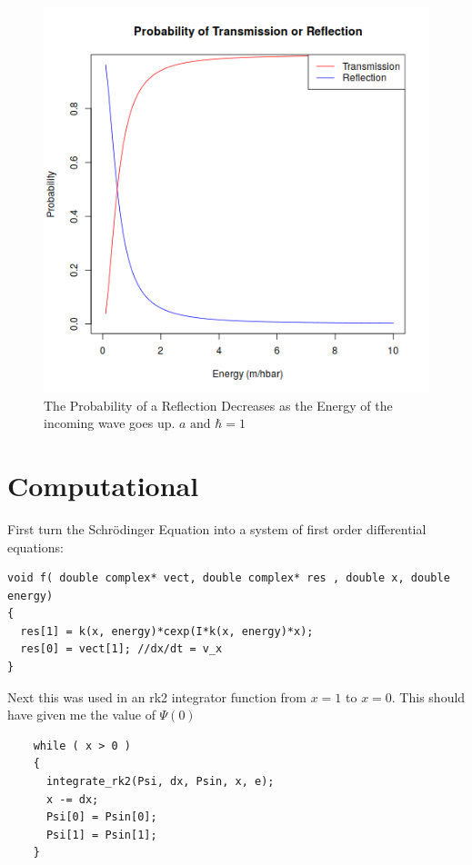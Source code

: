 \documentclass[12pt]{article}
\begin{document}
\begin{figure}
  \includegraphics{transorref.png}
  \caption{The Probability of a Reflection Decreases as the Energy of the incoming wave goes up. $a \mbox{ and } \hbar=1$}
\end{figure}



\pagebreak
\section{Computational}

First turn the Schr{\"o}dinger Equation into a system of first order differential equations:

\begin{verbatim}
void f( double complex* vect, double complex* res , double x, double energy)
{
  res[1] = k(x, energy)*cexp(I*k(x, energy)*x);
  res[0] = vect[1]; //dx/dt = v_x
}
\end{verbatim}

Next this was used in an rk2 integrator function from $x=1$ to $x=0$. This should have given me the value of $\Psi(0)$
\begin{verbatim}
    while ( x > 0 )
    {
      integrate_rk2(Psi, dx, Psin, x, e);
      x -= dx;
      Psi[0] = Psin[0];
      Psi[1] = Psin[1];
    }
\end{verbatim}
\end{document}
